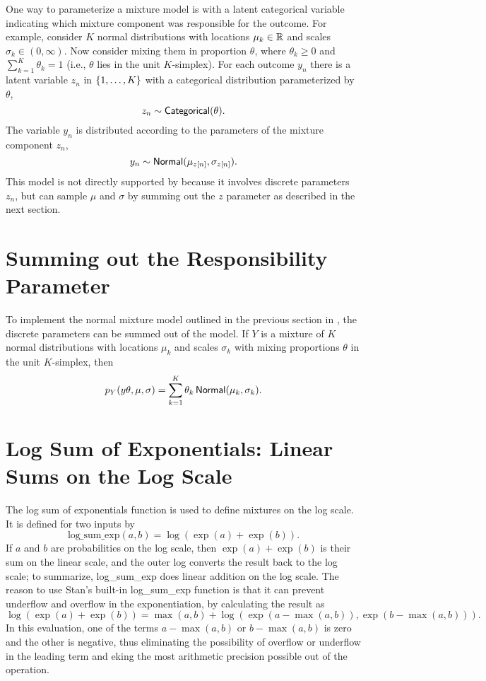 One way to parameterize a mixture model is with a latent categorical
variable indicating which mixture component was responsible for the
outcome. For example, consider $K$ normal distributions with locations
$\mu_k \in \mathbb{R}$ and scales $\sigma_k \in (0,\infty)$.  Now consider
mixing them in proportion $\theta$, where $\theta_k \geq 0$ and
$\sum_{k=1}^K \theta_k = 1$ (i.e., $\theta$ lies in the unit $K$-simplex).
For each outcome $y_n$ there is a latent variable $z_n$ in
$\{ 1,\ldots,K \}$ with a categorical distribution parameterized
by $\theta$,
%
\[
z_n \sim \mbox{\sf Categorical}(\theta).
\]
%
The variable $y_n$ is distributed according to the parameters
of the mixture component $z_n$, 
\[
y_n \sim \mbox{\sf Normal}(\mu_{z[n]},\sigma_{z[n]}).
\]
%
This model is not directly supported by \Stan because it involves
discrete parameters $z_n$, but \Stan can sample $\mu$ and $\sigma$ 
by summing out the $z$ parameter as described in the next section.


\section{Summing out the Responsibility Parameter}

To implement the normal mixture model outlined in the previous
section in \Stan, the discrete parameters can be summed out of the
model. If $Y$ is a mixture of $K$ normal distributions with 
locations $\mu_k$ and scales $\sigma_k$ with mixing proportions
$\theta$ in the unit $K$-simplex, then 
\[
p_Y(y\theta,\mu,\sigma) = \sum_{k=1}^K \theta_k \, \mbox{\sf Normal}(\mu_k,\sigma_k).
\]

\section{Log Sum of Exponentials: Linear Sums on the Log Scale}

The log sum of exponentials function is used to define mixtures on the
log scale.  It is defined for two inputs by
%
\[
\mbox{log\_sum\_exp}(a,b) = \log (\exp(a) + \exp(b)).
\]
%
If $a$ and $b$ are probabilities on the log scale, then $\exp(a) +
\exp(b)$ is their sum on the linear scale, and the outer log converts
the result back to the log scale; to summarize, log\_sum\_exp does
linear addition on the log scale.   The reason to use Stan's built-in
log\_sum\_exp function is that it can prevent underflow and overflow
in the exponentiation, by calculating the result as
%
\[
\log(\exp(a) + \exp(b))
= \max(a,b) + \log(\exp(a - \max(a,b)), \exp(b - \max(a,b))).
\]
%
In this evaluation, one of the terms $a - \max(a,b)$ or $b -
\max(a,b)$ is zero and the other is negative, thus eliminating the
possibility of overflow or underflow in the leading term and eking the
most arithmetic precision possible out of the operation.

